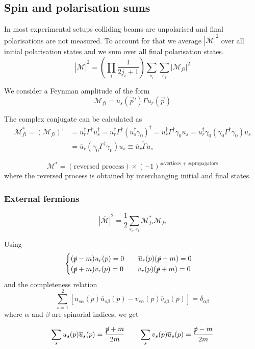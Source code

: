 \subsection{Spin and polarisation sums}
In most experimental setups colliding beams are unpolarised and final polarisations are not measured. To account for that we average $\left|\overline{\mathcal{M}}\right|^2$ over all initial polarisation states and we sum over all final polarisation states.
\[ \left|\overline{\mathcal{M}}\right|^2 = \left(\prod_i \frac{1}{2j_i+1}\right)\sum_{s_i}\sum_{s_f}\left|\mathcal{M}_{fi}\right|^2 \]

We consider a Feynman amplitude of the form
\[ \mathcal{M}_{fi} = \overline{u}_s(\vec{p}')\Gamma u_r(\vec{p}) \]

The complex conjugate can be calculated as
\begin{align*}
\mathcal{M}^*_{fi} = \left(\mathcal{M}_{fi}\right)^\dagger &= u_r^\dagger \Gamma^\dagger \overline{u}_s^\dagger = u^\dagger_r\Gamma^\dagger(u_s^\dagger\gamma_0)^\dagger = u_r^\dagger\Gamma^\dagger\gamma_0u_s = u_r^\dagger\gamma_0\left(\gamma_0\Gamma^\dagger\gamma_0\right)u_s \\
&= \overline{u}_r\left(\gamma_0\Gamma^\dagger\gamma_0\right)u_s \equiv \overline{u}_r\tilde{\Gamma}u_s
\end{align*}


\[ \mathcal{M}^* = (\text{reversed process})\times (-1)^{\text{\#vertices + \#propagators}} \]
where the reversed process is obtained by interchanging initial and final states. 
\subsubsection{External fermions}

\[ |\overline{\mathcal{M}}|^2 = \frac{1}{2}\sum_{s_i,s_f}\mathcal{M}^*_{fi}\mathcal{M}_{fi} \]

Using
\[ \begin{cases}
(\slashed{p}-m)u_r(p) = 0 \qquad \overline{u}_r(p)(\slashed{p}-m) = 0 \\
(\slashed{p}+m)v_r(p) = 0 \qquad \overline{v}_r(p)(\slashed{p}+m) = 0
\end{cases} \]
and the completeness relation
\[ \sum^2_{s=1} \left[u_{s\alpha}(p)\overline{u}_{s\beta}(p) - v_{s\alpha}(p)\overline{v}_{s\beta}(p)\right] = \delta_{\alpha\beta} \]
where $\alpha$ and $\beta$ are spinorial indices,
we get

\[ \sum_s u_s(p) \overline{u}_s(p) = \frac{\slashed{p} + m}{2m} \qquad \sum_s v_s(p) \overline{u}_s(p) = \frac{\slashed{p} - m}{2m} \]

